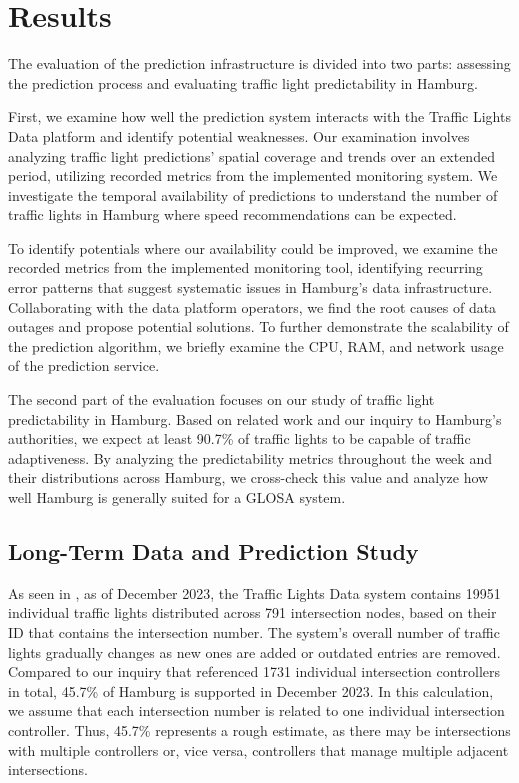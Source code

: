 \section{Results}

The evaluation of the prediction infrastructure is divided into two parts: assessing the prediction process and evaluating traffic light predictability in Hamburg.

First, we examine how well the prediction system interacts with the Traffic Lights Data platform and identify potential weaknesses. Our examination involves analyzing traffic light predictions' spatial coverage and trends over an extended period, utilizing recorded metrics from the implemented monitoring system. We investigate the temporal availability of predictions to understand the number of traffic lights in Hamburg where speed recommendations can be expected. 

To identify potentials where our availability could be improved, we examine the recorded metrics from the implemented monitoring tool, identifying recurring error patterns that suggest systematic issues in Hamburg's data infrastructure. Collaborating with the data platform operators, we find the root causes of data outages and propose potential solutions. To further demonstrate the scalability of the prediction algorithm, we briefly examine the CPU, RAM, and network usage of the prediction service.

The second part of the evaluation focuses on our study of traffic light predictability in Hamburg. Based on related work and our inquiry to Hamburg's authorities, we expect at least 90.7\% of traffic lights to be capable of traffic adaptiveness. By analyzing the predictability metrics throughout the week and their distributions across Hamburg, we cross-check this value and analyze how well Hamburg is generally suited for a GLOSA system.

\subsection{Long-Term Data and Prediction Study}

As seen in , as of December 2023, the Traffic Lights Data system contains 19951 individual traffic lights distributed across 791 intersection nodes, based on their ID that contains the intersection number. The system's overall number of traffic lights gradually changes as new ones are added or outdated entries are removed. Compared to our inquiry that referenced 1731 individual intersection controllers in total, 45.7\% of Hamburg is supported in December 2023. In this calculation, we assume that each intersection number is related to one individual intersection controller. Thus, 45.7\% represents a rough estimate, as there may be intersections with multiple controllers or, vice versa, controllers that manage multiple adjacent intersections.

